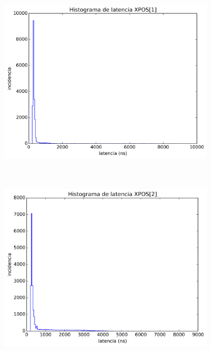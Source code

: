 \begin{figure}[ht!]
\captionsetup[subfigure]{justification=centering}
     \begin{center}
%
        \begin{subfigure}[b]{0.4\textwidth}
        	\includegraphics[width=\textwidth]{figures/ch6_histograma_source_6.png}
		    \caption{}
		    \label{fig:histograma_6}
	    \end{subfigure}
	    ~ %
	    \begin{subfigure}[b]{0.4\textwidth}
	    	\includegraphics[width=\textwidth]{figures/ch6_histograma_source_7.png}

\end{subfigure}
\end{center}
\end{figure}
